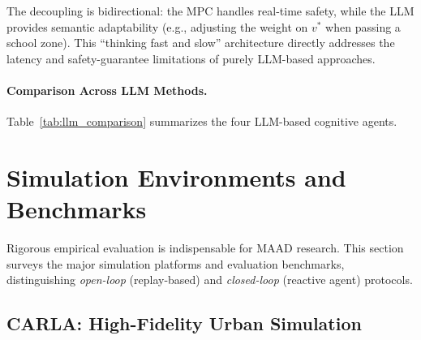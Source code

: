 \documentclass[12pt, a4paper]{article}
\begin{document}
The decoupling is bidirectional: the MPC handles real-time safety, while the LLM
provides semantic adaptability (e.g., adjusting the weight on $v^*$ when passing
a school zone). This ``thinking fast and slow'' architecture directly addresses
the latency and safety-guarantee limitations of purely LLM-based approaches.

\paragraph{Comparison Across LLM Methods.}
Table~\ref{tab:llm_comparison} summarizes the four LLM-based cognitive agents.

\begin{table}[htbp]
\centering
\caption{Comparison of LLM-based cognitive driving agents.}
\label{tab:llm_comparison}
\end{table}

\section{Simulation Environments and Benchmarks}
\label{sec:benchmarks}

Rigorous empirical evaluation is indispensable for MAAD research. This section
surveys the major simulation platforms and evaluation benchmarks, distinguishing
\emph{open-loop} (replay-based) and \emph{closed-loop} (reactive agent) protocols.

\subsection{CARLA: High-Fidelity Urban Simulation}
\end{document}
